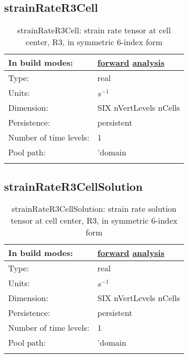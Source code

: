 \subsection[strainRateR3Cell]{strainRateR3Cell}
\label{subsec:var_sec_scratch_strainRateR3Cell}
\begin{center}
\begin{longtable}{| p{2.0in} | p{4.0in} |}
        \hline 
        In build modes: & \hyperref[subsec:forward_var_tab_scratch]{forward} \hyperref[subsec:analysis_var_tab_scratch]{analysis} \\
        \hline 
        Type: & real \\
        \hline 
        Units: & $s^{-1}$ \\
        \hline 
        Dimension: & SIX nVertLevels nCells \\
        \hline 
        Persistence: & persistent \\
        \hline 
        Number of time levels: & 1 \\
        \hline 
            Pool path: & 'domain %
 \\
		 \hline 
    \caption{strainRateR3Cell: strain rate tensor at cell center, R3, in symmetric 6-index form}
\end{longtable}
\end{center}
\subsection[strainRateR3CellSolution]{strainRateR3CellSolution}
\label{subsec:var_sec_scratch_strainRateR3CellSolution}
\begin{center}
\begin{longtable}{| p{2.0in} | p{4.0in} |}
        \hline 
        In build modes: & \hyperref[subsec:forward_var_tab_scratch]{forward} \hyperref[subsec:analysis_var_tab_scratch]{analysis} \\
        \hline 
        Type: & real \\
        \hline 
        Units: & $s^{-1}$ \\
        \hline 
        Dimension: & SIX nVertLevels nCells \\
        \hline 
        Persistence: & persistent \\
        \hline 
        Number of time levels: & 1 \\
        \hline 
            Pool path: & 'domain %
 \\
		 \hline 
    \caption{strainRateR3CellSolution: strain rate solution tensor at cell center, R3, in symmetric 6-index form}
\end{longtable}
\end{center}
